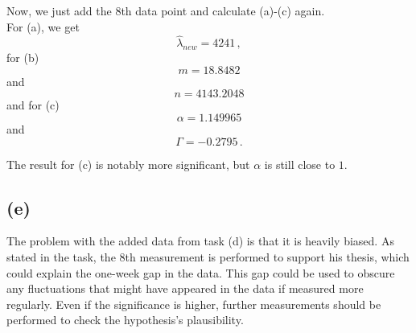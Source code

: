 Now, we just add the 8th data point and calculate (a)-(c) again. \\

For (a), we get
\begin{equation*}
    \hat{\lambda}_{new} = 4241 \,,
\end{equation*}
for (b)
\begin{equation*}
    m = 18.8482 
\end{equation*}
and
\begin{equation*}
    n = 4143.2048
\end{equation*}
and for (c)
\begin{equation*}
    \alpha = 1.149965
\end{equation*}
and
\begin{equation*}
    \Gamma = -0.2795 \,.
\end{equation*}

The result for (c) is notably more significant, but $\alpha$ is still close to $1$.

\subsection*{(e)}

The problem with the added data from task (d) is that it is heavily biased.
As stated in the task, the 8th measurement is performed to support his thesis, which could explain the one-week gap in the data.
This gap could be used to obscure any fluctuations that might have appeared in the data if measured more regularly.
Even if the significance is higher, further measurements should be performed to check the hypothesis's plausibility.

